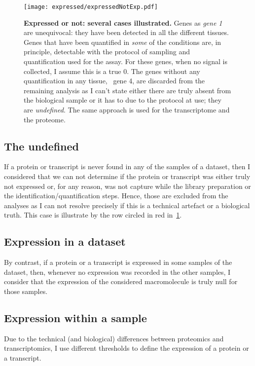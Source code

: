 \begin{figure}[!htbp]
    \texttt{[image: expressed/expressedNotExp.pdf]}\centering
      \caption[Expressed or not: several cases illustrated]
      {\label{fig:DefineExpression}\textbf{Expressed or not: several cases
      illustrated.}\smallbreak{} Genes as \emph{gene 1} are unequivocal: they have been
      detected in all the different tissues. Genes that have been quantified in
      \emph{some} of the conditions are, in principle, detectable with the
      protocol of sampling and quantification used for the assay.
      For these genes, when no signal is collected, I assume this is a true $0$.
      The genes without any quantification
      in any tissue, \eg\ gene 4, are discarded from the remaining analysis as
      I can't state
      either there are truly absent from the biological sample or it has to due
      to the protocol at use; they are \emph{undefined}. The same approach is used
      for the transcriptome and the proteome.}
\end{figure}

\subsection{The undefined}%
\label{subsec:ExpressedOrNot-undefined}
If a protein or transcript is never found in any of the samples of a dataset,
then I considered that we can not determine if the protein or transcript was
either truly not expressed or, for any reason, was not capture while the library
preparation or the identification/quantification steps. Hence, those are
excluded from the analyses as I can not resolve precisely if this is a
technical artefact or a biological truth. This case is illustrate by the row
circled in red in~\cref{fig:DefineExpression}.

\subsection{Expression in a dataset}
\label{subsec:ExpressedOrNot--expDataset}
By contrast, if a protein or a transcript is expressed in some samples of the
dataset, then, whenever no expression was recorded in the other
samples, I consider that the expression of the considered macromolecule is truly
null for those samples.

\subsection{Expression within a sample}
Due to the technical (and biological) differences between proteomics and
transcriptomics, I use different thresholds to define the expression of a protein
or a transcript.

